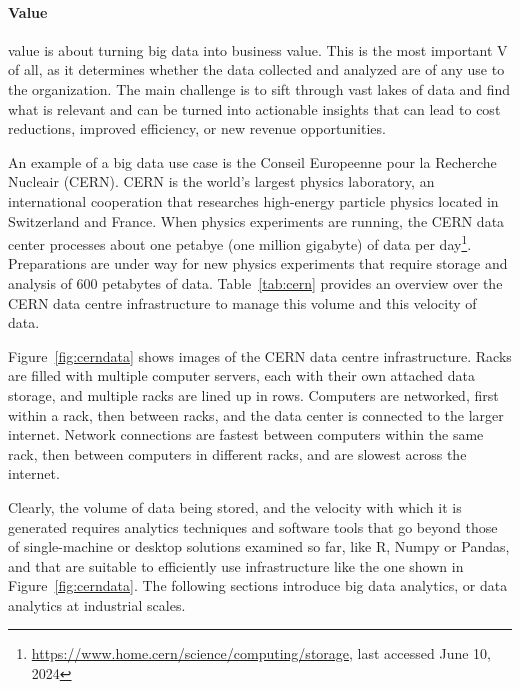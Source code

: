 \paragraph*{Value} value is about turning big data into business value. This is the most important V of all, as it determines whether the data collected and analyzed are of any use to the organization. The main challenge is to sift through vast lakes of data and find what is relevant and can be turned into actionable insights that can lead to cost reductions, improved efficiency, or new revenue opportunities.

An example of a big data use case is the Conseil Europeenne pour la Recherche Nucleair (CERN). CERN is the world's largest physics laboratory, an international cooperation that researches high-energy particle physics located in Switzerland and France. When physics experiments are running, the CERN data center processes about one petabye (one million gigabyte) of data per day\footnote{\url{https://www.home.cern/science/computing/storage}, last accessed June 10, 2024}. Preparations are under way for new physics experiments that require storage and analysis of 600 petabytes of data. Table~\ref{tab:cern} provides an overview over the CERN data centre infrastructure to manage this volume and this velocity of data. 

Figure~\ref{fig:cerndata} shows images of the CERN data centre infrastructure. Racks are filled with multiple computer servers, each with their own attached data storage, and multiple racks are lined up in rows. Computers are networked, first within a rack, then between racks, and the data center is connected to the larger internet. Network connections are fastest between computers within the same rack, then between computers in different racks, and are slowest across the internet. 

Clearly, the volume of data being stored, and the velocity with which it is generated requires analytics techniques and software tools that go beyond those of single-machine or desktop solutions examined so far, like R, Numpy or Pandas, and that are suitable to efficiently use infrastructure like the one shown in Figure~\ref{fig:cerndata}. The following sections introduce big data analytics, or data analytics at industrial scales. 

